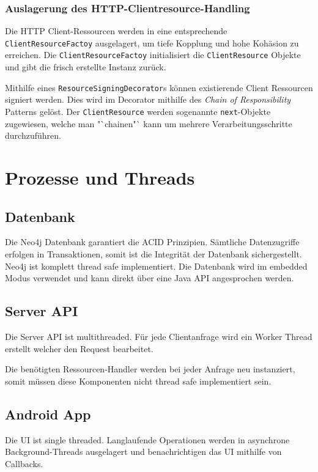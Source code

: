 \documentclass[10pt,a4paper]{scrartcl}
\begin{document}
\subsubsection*{Auslagerung des HTTP-Clientresource-Handling}

Die HTTP Client-Ressourcen werden in eine entsprechende \texttt{ClientResourceFactoy}
ausgelagert, um tiefe Kopplung und hohe Kohäsion zu erreichen. Die \texttt{ClientResourceFactoy}
initialisiert die \texttt{ClientResource} Objekte und gibt die frisch erstellte Instanz zurück.

Mithilfe eines \texttt{ResourceSigningDecorator}s können existierende Client Ressourcen signiert
werden. Dies wird im Decorator mithilfe des \textit{Chain of Responsibility} Patterns gelöst. Der
\texttt{ClientResource} werden sogenannte \texttt{next}-Objekte zugewiesen, welche man "`chainen"`
kann um mehrere Verarbeitungsschritte durchzuführen.


\newpage
\section{Prozesse und Threads}

\subsection{Datenbank}

Die Neo4j Datenbank garantiert die ACID Prinzipien.
Sämtliche Datenzugriffe erfolgen in Transaktionen, somit ist die Integrität der Datenbank
sichergestellt.
Neo4j ist komplett thread safe implementiert.  Die Datenbank wird im
embedded Modus verwendet und kann direkt über eine Java API angesprochen werden.

\subsection{Server API}

Die Server API ist multithreaded. Für jede Clientanfrage wird ein Worker Thread erstellt welcher den
Request bearbeitet.

Die benötigten Ressourcen-Handler werden bei jeder Anfrage neu instanziert, somit müssen diese
Komponenten nicht thread safe implementiert sein.

\subsection{Android App}

Die UI ist single threaded. Langlaufende Operationen werden in asynchrone Background-Threads ausgelagert und
benachrichtigen das UI mithilfe von Callbacks.
\end{document}
